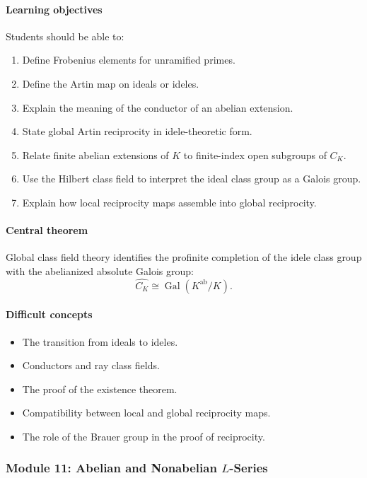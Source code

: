 \documentclass[11pt]{article}
\newcommand{\Gal}{\operatorname{Gal}}
\begin{document}
\paragraph{Learning objectives}
Students should be able to:
\begin{enumerate}
    \item Define Frobenius elements for unramified primes.
    \item Define the Artin map on ideals or ideles.
    \item Explain the meaning of the conductor of an abelian extension.
    \item State global Artin reciprocity in idele-theoretic form.
    \item Relate finite abelian extensions of $K$ to finite-index open subgroups of $C_K$.
    \item Use the Hilbert class field to interpret the ideal class group as a Galois group.
    \item Explain how local reciprocity maps assemble into global reciprocity.
\end{enumerate}

\paragraph{Central theorem}
Global class field theory identifies the profinite completion of the idele class group with the abelianized absolute Galois group:
\[
\widehat{C_K}
\cong
\Gal(K^{\mathrm{ab}}/K).
\]

\paragraph{Difficult concepts}
\begin{itemize}
    \item The transition from ideals to ideles.
    \item Conductors and ray class fields.
    \item The proof of the existence theorem.
    \item Compatibility between local and global reciprocity maps.
    \item The role of the Brauer group in the proof of reciprocity.
\end{itemize}

\subsubsection*{Module 11: Abelian and Nonabelian $L$-Series}
\end{document}
